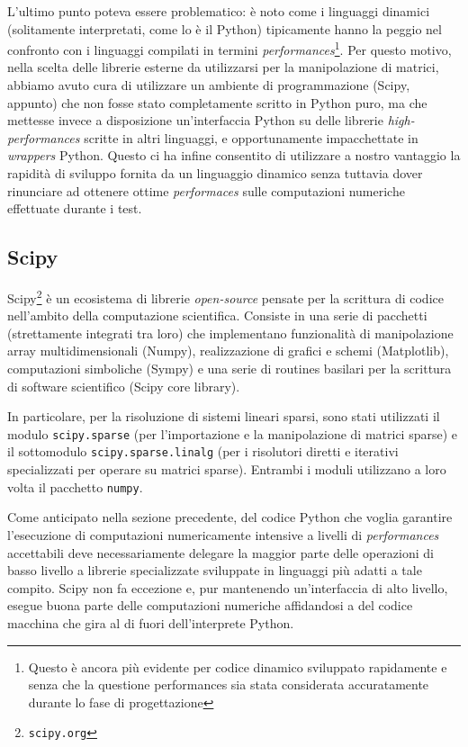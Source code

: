 \documentclass[11pt,a4paper]{scrartcl}
\begin{document}
L'ultimo punto poteva essere problematico: è noto come i linguaggi dinamici (solitamente interpretati, come lo è il Python) tipicamente hanno la peggio nel confronto con i linguaggi compilati in termini \emph{performances}\footnote{Questo è ancora più evidente per codice dinamico sviluppato rapidamente e senza che la questione performances sia stata considerata accuratamente durante lo fase di progettazione}. Per questo motivo, nella scelta delle librerie esterne da utilizzarsi per la manipolazione di matrici, abbiamo avuto cura di utilizzare un ambiente di programmazione (Scipy, appunto) che non fosse stato completamente scritto in Python puro, ma che mettesse invece a disposizione un'interfaccia Python su delle librerie \emph{high-performances} scritte in altri linguaggi, e opportunamente impacchettate in \emph{wrappers} Python. Questo ci ha infine consentito di utilizzare a nostro vantaggio la rapidità di sviluppo fornita da un linguaggio dinamico senza tuttavia dover rinunciare ad ottenere ottime \emph{performaces} sulle computazioni numeriche effettuate durante i test.


\subsection*{Scipy}
Scipy\footnote{\texttt{scipy.org}} è un ecosistema di librerie \emph{open-source} pensate per la scrittura di codice nell'ambito della computazione scientifica. Consiste in una serie di pacchetti (strettamente integrati tra loro) che implementano funzionalità di manipolazione array multidimensionali (Numpy), realizzazione di grafici e schemi (Matplotlib), computazioni simboliche (Sympy) e una serie di routines basilari per la scrittura di software scientifico (Scipy core library).

In particolare, per la risoluzione di sistemi lineari sparsi, sono stati utilizzati il modulo \texttt{scipy.sparse} (per l'importazione e la manipolazione di matrici sparse) e il sottomodulo \texttt{scipy.sparse.linalg} (per i risolutori diretti e iterativi specializzati per operare su matrici sparse). Entrambi i moduli utilizzano a loro volta il pacchetto \texttt{numpy}.

Come anticipato nella sezione precedente, del codice Python che voglia garantire l'esecuzione di computazioni numericamente intensive a livelli di \emph{performances} accettabili deve necessariamente delegare la maggior parte delle operazioni di basso livello a librerie specializzate sviluppate in linguaggi più adatti a tale compito. Scipy non fa eccezione e, pur mantenendo un'interfaccia di alto livello, esegue buona parte delle computazioni numeriche affidandosi a del codice macchina che gira al di fuori dell'interprete Python. 
\end{document}
